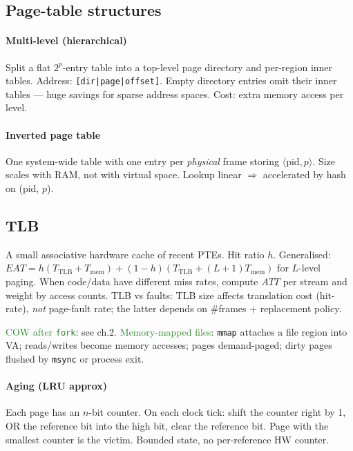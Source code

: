 \subsection{Page-table structures}
\paragraph{Multi-level (hierarchical)} Split a flat $2^p$-entry table into a top-level \textcolor{Bittersweet}{page directory} and per-region inner tables. Address: \texttt{[dir|page|offset]}. Empty directory entries omit their inner tables — huge savings for sparse address spaces. Cost: extra memory access per level.

\paragraph{Inverted page table} One system-wide table with one entry per \emph{physical} frame storing $\langle\text{pid}, p\rangle$. Size scales with RAM, not with virtual space. Lookup linear $\Rightarrow$ accelerated by hash on (pid, $p$).

\subsection{TLB}
A small associative hardware cache of recent PTEs. Hit ratio $h$.
Generalised: $EAT = h(T_{\mathrm{TLB}}+T_{\mathrm{mem}}) + (1-h)(T_{\mathrm{TLB}}+(L+1)T_{\mathrm{mem}})$ for $L$-level paging.
When code/data have different miss rates, compute $ATT$ per stream and weight by access counts.
\textcolor{Bittersweet}{TLB vs faults}: TLB size affects translation cost (hit-rate), \emph{not} page-fault rate; the latter depends on \#frames + replacement policy.

\textcolor{ForestGreen}{COW after \texttt{fork}}: see ch.2.
\textcolor{ForestGreen}{Memory-mapped files}: \texttt{mmap} attaches a file region into VA; reads/writes become memory accesses; pages demand-paged; dirty pages flushed by \texttt{msync} or process exit.

\paragraph{Aging (LRU approx)}
Each page has an $n$-bit counter. On each clock tick: shift the counter right by 1, OR the reference bit into the high bit, clear the reference bit. Page with the smallest counter is the victim. Bounded state, no per-reference HW counter.

